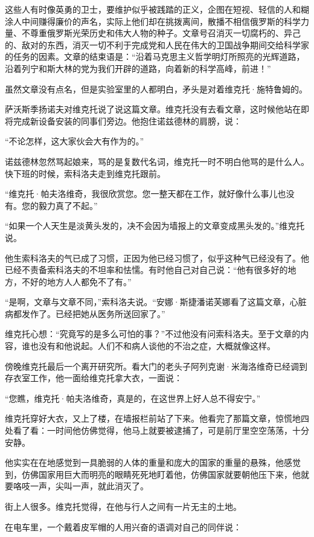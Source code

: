 这些人有时像英勇的卫士，要维护似乎被践踏的正义，企图在短视、轻信的人和糊涂人中间赚得廉价的声名，实际上他们却在挑拨离间，散播不相信俄罗斯的科学力量、不尊重俄罗斯光荣历史和伟大人物的种子。文章号召消灭一切腐朽的、异己的、敌对的东西，消灭一切不利于完成党和人民在伟大的卫国战争期间交给科学家的任务的因素。文章的结束语是：“沿着马克思主义哲学明灯所照亮的光辉道路，沿着列宁和斯大林的党为我们开辟的道路，向着新的科学高峰，前进！”

虽然文章没有点名，但是实验室里的人都明白，矛头是对着维克托·施特鲁姆的。

萨沃斯季扬诺夫对维克托说了说这篇文章。维克托没有去看文章，这时候他站在即将完成新设备安装的同事们旁边。他抱住诺兹德林的肩膀，说：

“不论怎样，这大家伙会大有作为的。”

诺兹德林忽然骂起娘来，骂的是复数代名词，维克托一时不明白他骂的是什么人。快下班的时候，索科洛夫走到维克托跟前。

“维克托·帕夫洛维奇，我很欣赏您。您一整天都在工作，就好像什么事儿也没有。您的毅力真了不起。”

“如果一个人天生是淡黄头发的，决不会因为墙报上的文章变成黑头发的。”维克托说。

他生索科洛夫的气已成了习惯，正因为他已经习惯了，似乎这种气已经没有了。他已经不责备索科洛夫的不坦率和怯懦。有时他自己对自己说：“他有很多好的地方，不好的地方人人都免不了有。”

“是啊，文章与文章不同，”索科洛夫说。“安娜·斯捷潘诺芙娜看了这篇文章，心脏病都发作了。已经把她从医务所送回家了。”

维克托心想：“究竟写的是多么可怕的事？”不过他没有问索科洛夫。至于文章的内容，谁也没有和他说起。人们不和病人谈他的不治之症，大概就像这样。

傍晚维克托最后一个离开研究所。看大门的老头子阿列克谢·米海洛维奇已经调到存衣室工作，他一面给维克托拿大衣，一面说：

“您瞧，维克托·帕夫洛维奇，真是的，在这世界上好人总不得安宁。”

维克托穿好大衣，又上了楼，在墙报栏前站了下来。他看完了那篇文章，惊慌地四处看了看：一时间他仿佛觉得，他马上就要被逮捕了，可是前厅里空空荡荡，十分安静。

他实实在在地感觉到一具脆弱的人体的重量和庞大的国家的重量的悬殊，他感觉到，仿佛国家用巨大而明亮的眼睛死死地盯着他，仿佛国家就要朝他压下来，他就要咯吱一声，尖叫一声，就此消灭了。

街上人很多。维克托觉得，在他与行人之间有一片无主的土地。

在电车里，一个戴着皮军帽的人用兴奋的语调对自己的同伴说：

